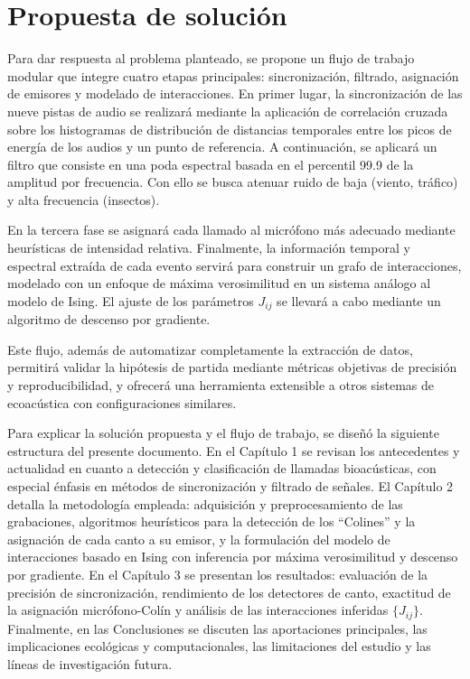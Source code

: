 \section{Propuesta de solución}
\label{sec:propuesta_solucion}

Para dar respuesta al problema planteado, se propone un 
flujo de trabajo modular que integre cuatro etapas principales: 
sincronización, filtrado, asignación de 
emisores y modelado de interacciones. En primer lugar, la 
sincronización de las nueve pistas de audio se realizará 
mediante la aplicación de correlación cruzada sobre los histogramas
de distribución de distancias temporales entre los picos de energía de los audios 
y un punto de referencia. A continuación, se 
aplicará un filtro que consiste en una poda espectral
basada en el percentil 99.9 de la amplitud por frecuencia.
Con ello se busca atenuar 
ruido de baja (viento, tráfico) y alta frecuencia (insectos).  

En la tercera fase se asignará cada 
llamado al micrófono más adecuado mediante heurísticas de 
intensidad relativa. 
Finalmente, la información temporal y espectral extraída de cada 
evento servirá para construir un grafo de interacciones, 
modelado con un enfoque de máxima verosimilitud en un sistema 
análogo al modelo de Ising. El ajuste de los 
parámetros \(J_{ij}\) se llevará a cabo mediante un algoritmo de 
descenso por gradiente.  

Este flujo, además de automatizar completamente la extracción de 
datos, permitirá validar la hipótesis de partida mediante 
métricas objetivas de precisión y reproducibilidad, y ofrecerá 
una herramienta extensible a otros sistemas de ecoacústica con 
configuraciones similares.  


Para explicar la solución propuesta y el flujo de trabajo, 
se diseñó la siguiente estructura del presente documento. 
En el Capítulo 1 se revisan los antecedentes y actualidad en cuanto a 
detección y 
clasificación de llamadas bioacústicas, con especial énfasis 
en métodos de sincronización y filtrado de señales. 
El Capítulo 2 detalla la metodología empleada: adquisición y 
preprocesamiento de las grabaciones, algoritmos heurísticos 
para la detección de los “Colines” y la asignación de cada 
canto a su emisor, y la formulación del modelo de interacciones 
basado en Ising con inferencia por máxima verosimilitud y 
descenso por gradiente. En el Capítulo 3 se presentan los 
resultados: evaluación de la precisión de 
sincronización, rendimiento de los detectores de canto, 
exactitud de la asignación micrófono-Colín y análisis de las 
interacciones inferidas \(\{J_{ij}\}\). Finalmente, en las 
Conclusiones se discuten las aportaciones principales, las 
implicaciones ecológicas y computacionales, las limitaciones 
del estudio y las líneas de investigación futura.  

